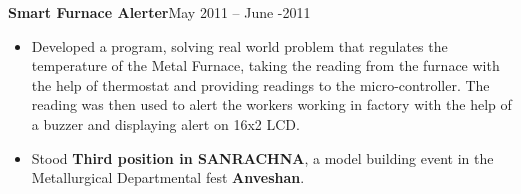 \documentclass[margin,line]{res}
\begin{document}
\begin{resume}
{\bf Smart Furnace Alerter}\hfill {May 2011 -- June -2011}
\begin{itemize} %
  \setlength{\itemsep}{0.01pt}
  \setlength{\parskip}{0pt}
  \setlength{\parsep}{0pt}
\item Developed a program, solving real world problem that regulates the temperature of the Metal Furnace, taking the reading from the furnace with the help of thermostat and providing readings to the micro-controller. The reading was then used to alert the workers working in factory with the help of a buzzer and displaying alert on 16x2 LCD.
\item Stood {\bf Third position in SANRACHNA}, a model building event in the Metallurgical Departmental fest {\bf Anveshan}.
\end{itemize}


\end{resume}
\end{document}
